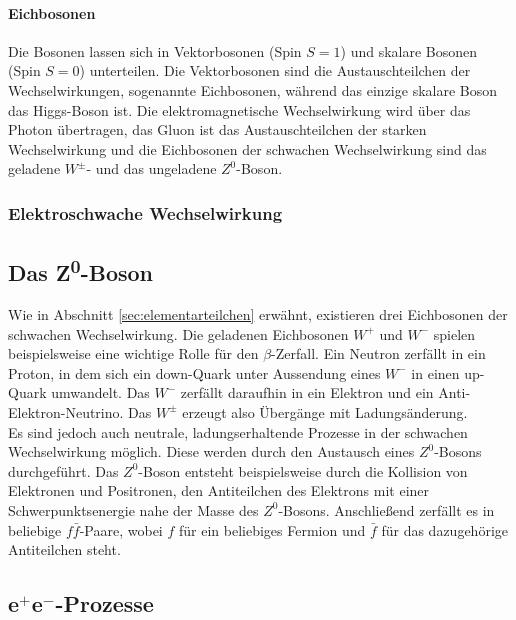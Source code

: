 \paragraph{Eichbosonen}
Die Bosonen lassen sich in Vektorbosonen (Spin $S=1$) und skalare Bosonen (Spin $S=0$) unterteilen. Die Vektorbosonen sind die Austauschteilchen der Wechselwirkungen, sogenannte Eichbosonen, während das einzige skalare Boson das Higgs-Boson ist. Die elektromagnetische Wechselwirkung wird über das Photon übertragen, das Gluon ist das Austauschteilchen der starken Wechselwirkung und die Eichbosonen der schwachen Wechselwirkung sind das geladene $W^\pm$- und das ungeladene $Z^0$-Boson.

\subsubsection{Elektroschwache Wechselwirkung}



\subsection{Das Z\textsuperscript0-Boson}

Wie in Abschnitt \ref{sec:elementarteilchen} erwähnt, existieren drei Eichbosonen der schwachen Wechselwirkung. Die geladenen Eichbosonen $W^+$ und $W^-$ spielen beispielsweise eine wichtige Rolle für den $\beta$-Zerfall. Ein Neutron zerfällt in ein Proton, in dem sich ein down-Quark unter Aussendung eines $W^-$ in einen up-Quark umwandelt. Das $W^-$ zerfällt daraufhin in ein Elektron und ein Anti-Elektron-Neutrino. Das $W^\pm$ erzeugt also Übergänge mit Ladungsänderung.\\

Es sind jedoch auch neutrale, ladungserhaltende Prozesse in der schwachen Wechselwirkung möglich. Diese werden durch den Austausch eines $Z^0$-Bosons durchgeführt. Das $Z^0$-Boson entsteht beispielsweise durch die Kollision von Elektronen und Positronen, den Antiteilchen des Elektrons mit einer Schwerpunktsenergie nahe der Masse des $Z^0$-Bosons. Anschließend zerfällt es in beliebige $f\bar{f}$-Paare, wobei $f$ für ein beliebiges Fermion und $\bar{f}$ für das dazugehörige Antiteilchen steht.

\subsection{e$^+$e$^-$-Prozesse}\label{sec:e+e-}


